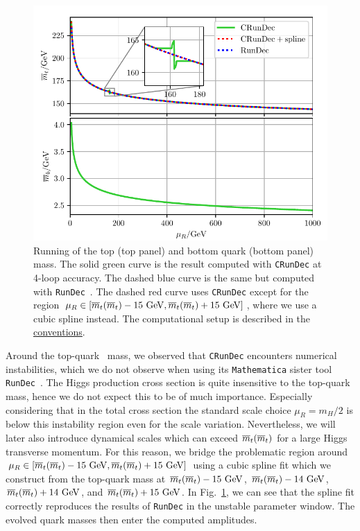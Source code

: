 \begin{figure}[ht]
\centering
\includegraphics[width=\figurewidth]{Images/mass_running.pdf}
\caption{Running of the top (top panel) and bottom quark (bottom panel) mass. The solid green curve is the result computed with \texttt{CRunDec} at 4-loop accuracy. The dashed blue curve is the same but computed with \texttt{RunDec}~\cite{Chetyrkin:2000yt}. The dashed red curve uses \texttt{CRunDec} except for the region $\mu_R \in [\msMass{t}-15 \ \mathrm{GeV}, \msMass{t} + 15 \ \mathrm{GeV}]$, where we use a cubic spline instead. The computational setup is described in the \hyperref[chap:notation_and_conventions]{conventions}.}
\label{fig:5:running}
\end{figure}
Around the top-quark \MS\ mass, we observed that \texttt{CRunDec} encounters numerical instabilities, which we do not observe when using its \texttt{Mathematica} sister tool \texttt{RunDec}~\cite{Chetyrkin:2000yt}. The Higgs production cross section is quite insensitive to the top-quark mass, hence we do not expect this to be of much importance. Especially considering that in the total cross section the standard scale choice $\mu_R = m_H/2$ is below this instability region even for the scale variation. Nevertheless, we will later also introduce dynamical scales which can exceed $\overline{m}_{t}\!\left(\overline{m}_{t} \right)$ for a large Higgs transverse momentum. For this reason, we bridge the problematic region around $\mu_R \in [\msMass{t} - 15 \ \mathrm{GeV}, \msMass{t} + 15\ \mathrm{GeV}]$ using a cubic spline fit which we construct from the top-quark mass at $\overline{m}_{t}\!\left(\overline{m}_{t} \right) - 15 \ \mathrm{GeV}$, $\overline{m}_{t}\!\left(\overline{m}_{t} \right) - 14 \ \mathrm{GeV}$,$\overline{m}_{t}\!\left(\overline{m}_{t} \right) + 14 \ \mathrm{GeV}$, and $\overline{m}_{t}\!\left(\overline{m}_{t} \right) + 15 \ \mathrm{GeV}$. In Fig.~\ref{fig:5:running}, we can see that the spline fit correctly reproduces the results of \texttt{RunDec} in the unstable parameter window. The evolved quark masses then enter the computed amplitudes.

